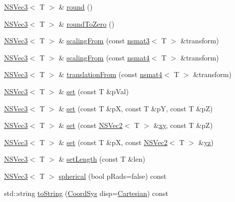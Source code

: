 \begin{DoxyCompactItemize}
\hyperlink{structNSVec3}{N\-S\-Vec3}$<$ T $>$ \& \hyperlink{structNSVec3_a7329e4221f8353f97132f91e89e121f2}{round} ()
\item 
\hyperlink{structNSVec3}{N\-S\-Vec3}$<$ T $>$ \& \hyperlink{structNSVec3_a3fc2bdf3c1a2d1b0da31008dacad42ba}{round\-To\-Zero} ()
\item 
\hyperlink{structNSVec3}{N\-S\-Vec3}$<$ T $>$ \& \hyperlink{structNSVec3_ae3bd201e31be3f7142e5bdab05d92699}{scaling\-From} (const \hyperlink{structnsmat3}{nsmat3}$<$ T $>$ \&transform)
\item 
\hyperlink{structNSVec3}{N\-S\-Vec3}$<$ T $>$ \& \hyperlink{structNSVec3_a3df7eb4c0a8a8e21122f30d4020bcfa7}{scaling\-From} (const \hyperlink{structnsmat4}{nsmat4}$<$ T $>$ \&transform)
\item 
\hyperlink{structNSVec3}{N\-S\-Vec3}$<$ T $>$ \& \hyperlink{structNSVec3_a5f22f2819615c6759ff768b13068510a}{translation\-From} (const \hyperlink{structnsmat4}{nsmat4}$<$ T $>$ \&transform)
\item 
\hyperlink{structNSVec3}{N\-S\-Vec3}$<$ T $>$ \& \hyperlink{structNSVec3_a6b1bfdfc23d4605784997cf8d88bb971}{set} (const T \&p\-Val)
\item 
\hyperlink{structNSVec3}{N\-S\-Vec3}$<$ T $>$ \& \hyperlink{structNSVec3_a7c3e8061e64dbf62159b62e74068dd5b}{set} (const T \&p\-X, const T \&p\-Y, const T \&p\-Z)
\item 
\hyperlink{structNSVec3}{N\-S\-Vec3}$<$ T $>$ \& \hyperlink{structNSVec3_aa92fcc44ccfb9518091eb9aec29c9fde}{set} (const \hyperlink{structNSVec2}{N\-S\-Vec2}$<$ T $>$ \&\hyperlink{structNSVec3_ad8219932251db48672b0b2e751712da3}{xy}, const T \&p\-Z)
\item 
\hyperlink{structNSVec3}{N\-S\-Vec3}$<$ T $>$ \& \hyperlink{structNSVec3_ab505c9b5d384ac4cb258f10aacfa439c}{set} (const T \&p\-X, const \hyperlink{structNSVec2}{N\-S\-Vec2}$<$ T $>$ \&\hyperlink{structNSVec3_ad9006cfc08381fb525d43715059f7c15}{yz})
\item 
\hyperlink{structNSVec3}{N\-S\-Vec3}$<$ T $>$ \& \hyperlink{structNSVec3_a638a0d35c0f648eb89b01ee9c6a4a965}{set\-Length} (const T \&len)
\item 
\hyperlink{structNSVec3}{N\-S\-Vec3}$<$ T $>$ \hyperlink{structNSVec3_af8d5d57f01d33e38b736c107c469dcdb}{spherical} (bool p\-Rads=false) const 
\item 
std\-::string \hyperlink{structNSVec3_a2ed3a0330719348f27be5ae498593645}{to\-String} (\hyperlink{structNSVec3_a79e942f48c6360d21b4e167c1ea890e2}{Coord\-Sys} disp=\hyperlink{structNSVec3_a79e942f48c6360d21b4e167c1ea890e2ab7be2cd66aaa6bee02585772e2db1f8d}{Cartesian}) const 

\end{DoxyCompactItemize}
